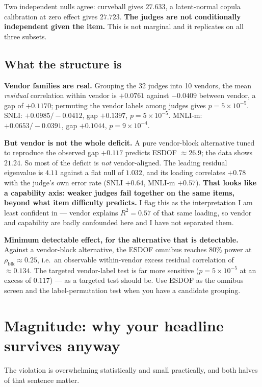 \documentclass[11pt]{article}
\theoremstyle{definition}
\begin{document}
\noindent Two independent nulls agree: curveball gives $27.633$, a latent-normal
copula calibration at zero effect gives $27.723$. \textbf{The judges are not
conditionally independent given the item.} This is not marginal and it replicates on
all three subsets.

\subsection{What the structure is}

\textbf{Vendor families are real.} Grouping the 32 judges into 10 vendors, the mean
\emph{residual} correlation within vendor is $+0.0761$ against $-0.0409$ between
vendor, a gap of $+0.1170$; permuting the vendor labels among judges gives
$p=5\times10^{-5}$. SNLI: $+0.0985/-0.0412$, gap $+0.1397$, $p=5\times10^{-5}$.
MNLI-m: $+0.0653/-0.0391$, gap $+0.1044$, $p=9\times10^{-4}$.

\textbf{But vendor is not the whole deficit.} A pure vendor-block alternative tuned
to reproduce the observed gap $+0.117$ predicts ESDOF $\approx26.9$; the data shows
$21.24$. So most of the deficit is \emph{not} vendor-aligned. The leading residual
eigenvalue is $4.11$ against a flat null of $1.032$, and its loading correlates
$+0.78$ with the judge's own error rate (SNLI $+0.64$, MNLI-m $+0.57$).
\textbf{That looks like a capability axis: weaker judges fail together on the same
items, beyond what item difficulty predicts.} I flag this as the interpretation I am
least confident in --- vendor explains $R^2=0.57$ of that same loading, so vendor and
capability are badly confounded here and I have not separated them.

\textbf{Minimum detectable effect, for the alternative that is detectable.} Against a
vendor-block alternative, the ESDOF omnibus reaches $80\%$ power at
$\rho_{\mathrm{blk}}\approx0.25$, i.e.\ an observable within-vendor excess residual
correlation of $\approx0.134$. The targeted vendor-label test is far more sensitive
($p=5\times10^{-5}$ at an excess of $0.117$) --- as a targeted test should be. Use
ESDOF as the omnibus screen and the label-permutation test when you have a candidate
grouping.

\section{Magnitude: why your headline survives anyway}

The violation is overwhelming statistically and small practically, and both halves
of that sentence matter.
\end{document}
